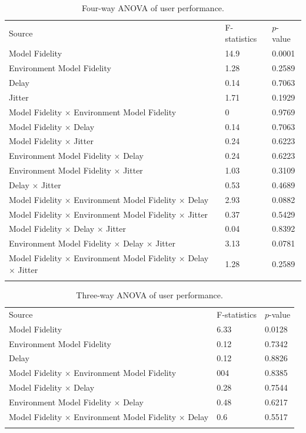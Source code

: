 \begin{table}[!htbp]
\caption{Four-way ANOVA of user performance.}
\label{tab:fau}
\begin{tabular}{lll}
\hline\noalign{\smallskip}
Source & F-statistics & $p$-value \\
\noalign{\smallskip}\hline\noalign{\smallskip}
Model Fidelity & 14.9 & 0.0001 \\
Environment Model Fidelity & 1.28 & 0.2589 \\
Delay & 0.14 & 0.7063 \\
Jitter & 1.71 & 0.1929 \\
Model Fidelity $\times$ Environment Model Fidelity & 0 & 0.9769 \\
Model Fidelity $\times$ Delay & 0.14 & 0.7063 \\
Model Fidelity $\times$ Jitter & 0.24 & 0.6223 \\
Environment Model Fidelity $\times$ Delay & 0.24 & 0.6223 \\
Environment Model Fidelity $\times$ Jitter & 1.03 & 0.3109 \\
Delay $\times$ Jitter & 0.53 & 0.4689 \\
Model Fidelity $\times$ Environment Model Fidelity $\times$ Delay & 2.93 & 0.0882 \\
Model Fidelity $\times$ Environment Model Fidelity $\times$ Jitter & 0.37 & 0.5429 \\
Model Fidelity $\times$ Delay $\times$ Jitter & 0.04 & 0.8392 \\
Environment Model Fidelity $\times$ Delay $\times$ Jitter & 3.13 & 0.0781 \\
Model Fidelity $\times$ Environment Model Fidelity $\times$ Delay $\times$ Jitter & 1.28 & 0.2589 \\
\noalign{\smallskip}\hline
\end{tabular}
\end{table}

\begin{table}[!htbp]
\caption{Three-way ANOVA of user performance.}
\label{tab:tau}
\begin{tabular}{lll}
\hline\noalign{\smallskip}
Source & F-statistics & $p$-value \\
\noalign{\smallskip}\hline\noalign{\smallskip}
Model Fidelity & 6.33 & 0.0128 \\
Environment Model Fidelity & 0.12 & 0.7342 \\
Delay & 0.12 & 0.8826 \\
Model Fidelity $\times$ Environment Model Fidelity & 004 & 0.8385 \\
Model Fidelity $\times$ Delay & 0.28 & 0.7544 \\
Environment Model Fidelity $\times$ Delay & 0.48 & 0.6217 \\
Model Fidelity $\times$ Environment Model Fidelity $\times$ Delay & 0.6 & 0.5517 \\
\noalign{\smallskip}\hline
\end{tabular}
\end{table}

